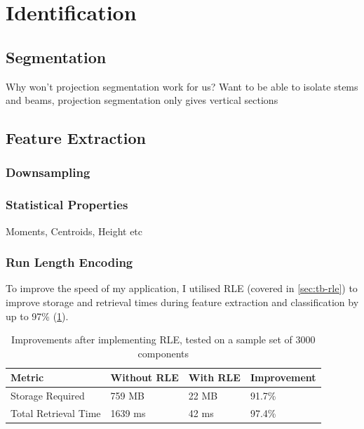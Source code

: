 \section{Identification}

\subsection{Segmentation}


Why won't projection segmentation work for us? Want to be able to isolate stems and beams, projection segmentation only gives vertical sections


\subsection{Feature Extraction}

\subsubsection{Downsampling}


\subsubsection{Statistical Properties}
\label{sec:statistical-properties}


Moments, Centroids, Height etc

\subsubsection{Run Length Encoding}
To improve the speed of my application, I utilised \acrfull{RLE} (covered in \cref{sec:tb-rle}) to improve storage and retrieval times during feature extraction and classification by up to 97\% (\cref{table:rle-improvement}).

\begin{table}[h]

    \begin{tabularx}{\textwidth}{ X X X X }
    \toprule
    Metric                  & Without RLE   & With RLE   & Improvement \\
    \midrule
    Storage Required        & 759 MB        & 22 MB      & 91.7\%      \\
    Total Retrieval Time    & 1639 ms       & 42 ms      & 97.4\% \\
    \bottomrule
    \end{tabularx}

    \label{table:rle-improvement}
    \caption{Improvements after implementing RLE, tested on a sample set of 3000 components}
\end{table}

